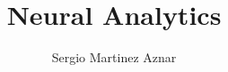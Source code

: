 \documentclass[a4paper,12pt]{report} %
\title{Neural Analytics}                       %
\author{Sergio Martinez Aznar}                 %
\begin{document}











\nocite{*}                                      %

\end{document}
